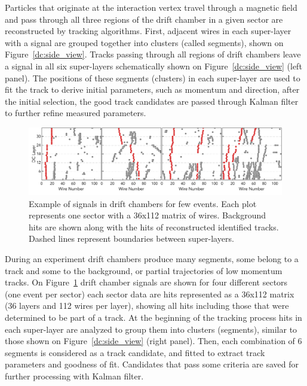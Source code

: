 Particles that originate at the interaction vertex travel through a magnetic field and pass through all three regions of the drift chamber in a given sector are reconstructed by tracking algorithms. First, adjacent  wires in each super-layer with a signal are grouped together into clusters (called segments), shown on Figure~\ref{dc:side_view}. Tracks passing through all regions of drift chambers leave a signal in all six super-layers schematically shown on Figure~\ref{dc:side_view} (left panel).  The positions of these segments (clusters) in each super-layer are used to fit the track to derive initial parameters, such as momentum and direction, after the initial selection, the good track candidates are passed through Kalman filter to further refine measured parameters.

\begin{figure}[!ht]
\begin{center}
 \includegraphics[width=6.2in]{images/figure_dc_examples.pdf}
\caption {Example of signals in drift chambers for few events. Each plot represents one sector with a 36x112 matrix of wires. Background hits are shown along with the hits of reconstructed identified tracks. Dashed lines represent boundaries between super-layers.}
 \label{dc:events_sector}
 \end{center}
\end{figure}

During an experiment drift chambers produce many segments, some belong to a track and some to the background, or partial trajectories of low momentum tracks. On Figure~\ref{dc:events_sector} drift chamber signals are shown for four different sectors (one event per sector) each sector data are hits represented as a 36x112 matrix (36 layers and 112 wires per layer), showing all hits including those that were determined to be part of a track. At the beginning of the tracking process hits in each super-layer are analyzed to group them into clusters (segments), similar to those shown on Figure~\ref{dc:side_view} (right panel). Then, each combination of 6 segments is considered as a track candidate, and fitted to extract track parameters and goodness of fit. Candidates that pass some criteria are saved for further processing with Kalman filter. 

